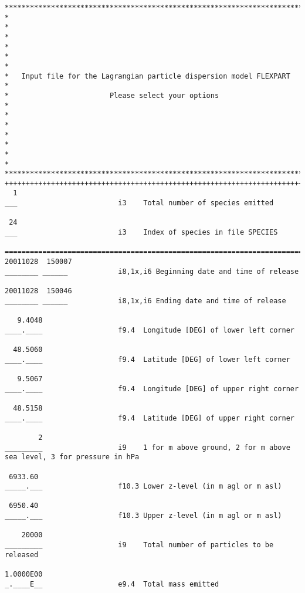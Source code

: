 \documentclass{egu}                  %
\begin{document}
\begin{scriptsize}\begin{verbatim}
*************************************************************************
*                                                                       *
*                                                                       *
*                                                                       *
*   Input file for the Lagrangian particle dispersion model FLEXPART    *
*                        Please select your options                     *
*                                                                       *
*                                                                       *
*                                                                       *
*************************************************************************
+++++++++++++++++++++++++++++++++++++++++++++++++++++++++++++++++++++++++
  1      
___                        i3    Total number of species emitted

 24
___                        i3    Index of species in file SPECIES

=========================================================================
20011028  150007
________ ______            i8,1x,i6 Beginning date and time of release

20011028  150046
________ ______            i8,1x,i6 Ending date and time of release

   9.4048 
____.____                  f9.4  Longitude [DEG] of lower left corner

  48.5060
____.____                  f9.4  Latitude [DEG] of lower left corner

   9.5067
____.____                  f9.4  Longitude [DEG] of upper right corner

  48.5158
____.____                  f9.4  Latitude [DEG] of upper right corner

        2
_________                  i9    1 for m above ground, 2 for m above sea level, 3 for pressure in hPa

 6933.60
_____.___                  f10.3 Lower z-level (in m agl or m asl)
 
 6950.40
_____.___                  f10.3 Upper z-level (in m agl or m asl)
 
    20000                
_________                  i9    Total number of particles to be released

1.0000E00
_.____E__                  e9.4  Total mass emitted


\end{verbatim}
\end{scriptsize}
\end{document}

